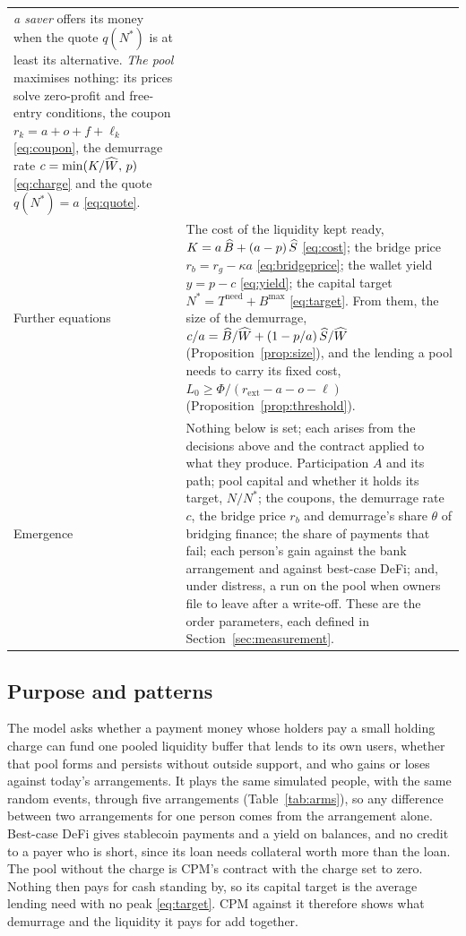\begin{table}[p]
\begin{tabularx}{\textwidth}{@{}p{}X@{}}
  \emph{a saver} offers its money when the quote $q(N^{*})$ is at least its alternative.
  \emph{The pool} maximises nothing: its prices solve zero-profit and free-entry conditions, the coupon
  $r_{k} = a + o + f + \ell_{k}$ \eqref{eq:coupon}, the demurrage rate $c = \min(K/\widehat{W},\, p)$ \eqref{eq:charge} and the
  quote $q(N^{*}) = a$ \eqref{eq:quote}. \\
\addlinespace
Further equations & The cost of the liquidity kept ready, $K = a\,\widehat{B} + (a - p)\,\widehat{S}$ \eqref{eq:cost}; the
  bridge price $r_{b} = r_{g} - \kappa a$ \eqref{eq:bridgeprice}; the wallet yield $y = p - c$ \eqref{eq:yield};
  the capital target $N^{*} = T^{\mathrm{need}} + B^{\max}$ \eqref{eq:target}. From them, the size of the demurrage,
  $c/a = \widehat{B}/\widehat{W} + (1 - p/a)\,\widehat{S}/\widehat{W}$ (Proposition~\ref{prop:size}), and the lending a pool needs to
  carry its fixed cost, $L_{0} \ge \Phi/(r_{\mathrm{ext}} - a - o - \ell)$ (Proposition~\ref{prop:threshold}). \\
\addlinespace
Emergence & Nothing below is set; each arises from the decisions above and the contract applied to what they
  produce. Participation $A$ and its path; pool capital and whether it holds its target, $N/N^{*}$; the coupons,
  the demurrage rate $c$, the bridge price $r_{b}$ and demurrage's share $\theta$ of bridging finance; the share
  of payments that fail; each person's gain against the bank arrangement and against best-case DeFi; and, under
  distress, a run on the pool when owners file to leave after a write-off. These are the order parameters, each
  defined in Section~\ref{sec:measurement}. \\
\bottomrule
\end{tabularx}
\end{table}

\subsection{Purpose and patterns}

The model asks whether a payment money whose holders pay a small holding charge can fund one pooled liquidity
buffer that lends to its own users, whether that pool forms and persists without outside support, and who gains or
loses against today's arrangements. It plays the same simulated people, with the same random events, through five
arrangements (Table~\ref{tab:arms}), so any difference between two arrangements for one person comes from the
arrangement alone. Best-case DeFi gives stablecoin payments and a yield on balances, and no credit to a payer who
is short, since its loan needs collateral worth more than the loan. The pool without
the charge is CPM's contract with the charge set to zero. Nothing then pays for cash standing by, so
its capital target is the average lending need with no peak \eqref{eq:target}. CPM against it therefore shows
what demurrage and the liquidity it pays for add together.

